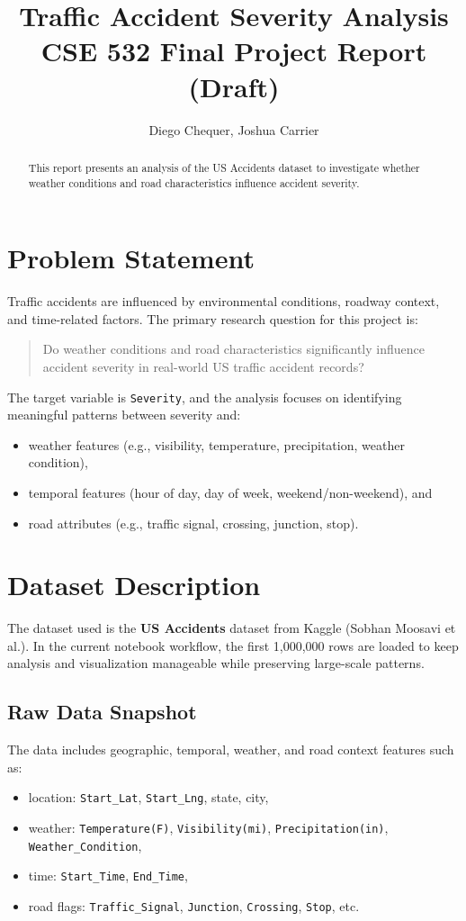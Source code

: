 \documentclass[11pt]{article}
\title{Traffic Accident Severity Analysis\\CSE 532 Final Project Report (Draft)}
\author{Diego Chequer, Joshua Carrier}
\begin{document}
\maketitle

\begin{abstract}
    This report presents an analysis of the US Accidents dataset
    to investigate whether weather conditions and road characteristics
    influence accident severity.
\end{abstract}

\section{Problem Statement}
Traffic accidents are influenced by environmental conditions, roadway context, and time-related factors. The primary research question for this project is:

\begin{quote}
    Do weather conditions and road characteristics significantly influence accident severity in real-world US traffic accident records?
\end{quote}

The target variable is \texttt{Severity}, and the analysis focuses on identifying meaningful patterns between severity and:
\begin{itemize}
    \item weather features (e.g., visibility, temperature, precipitation, weather condition),
    \item temporal features (hour of day, day of week, weekend/non-weekend), and
    \item road attributes (e.g., traffic signal, crossing, junction, stop).
\end{itemize}

\newpage
\section{Dataset Description}
The dataset used is the \textbf{US Accidents} dataset from Kaggle (Sobhan Moosavi et al.). In the current notebook workflow, the first 1,000,000 rows are loaded to keep analysis and visualization manageable while preserving large-scale patterns.

\subsection{Raw Data Snapshot}
The data includes geographic, temporal, weather, and road context features such as:
\begin{itemize}
    \item location: \texttt{Start\_Lat}, \texttt{Start\_Lng}, state, city,
    \item weather: \texttt{Temperature(F)}, \texttt{Visibility(mi)}, \texttt{Precipitation(in)}, \texttt{Weather\_Condition},
    \item time: \texttt{Start\_Time}, \texttt{End\_Time},
    \item road flags: \texttt{Traffic\_Signal}, \texttt{Junction}, \texttt{Crossing}, \texttt{Stop}, etc.
\end{itemize}
\end{document}
